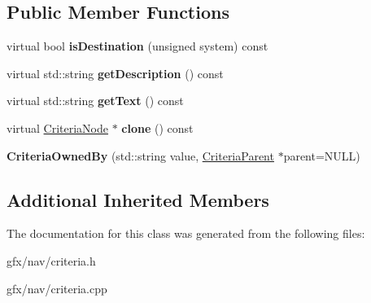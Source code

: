\subsection*{Public Member Functions}
\begin{DoxyCompactItemize}
\item 
virtual bool {\bfseries is\+Destination} (unsigned system) const \hypertarget{classCriteriaOwnedBy_adba0159fcddd0f1c9c232ff5457daf87}{}\label{classCriteriaOwnedBy_adba0159fcddd0f1c9c232ff5457daf87}

\item 
virtual std\+::string {\bfseries get\+Description} () const \hypertarget{classCriteriaOwnedBy_a8850acad3bc7efe24fba1770d540ae29}{}\label{classCriteriaOwnedBy_a8850acad3bc7efe24fba1770d540ae29}

\item 
virtual std\+::string {\bfseries get\+Text} () const \hypertarget{classCriteriaOwnedBy_a6b0bce2ffceb68965bc5eb674f5de909}{}\label{classCriteriaOwnedBy_a6b0bce2ffceb68965bc5eb674f5de909}

\item 
virtual \hyperlink{classCriteriaNode}{Criteria\+Node} $\ast$ {\bfseries clone} () const \hypertarget{classCriteriaOwnedBy_ae08538ab098360216dfa2403635efbe2}{}\label{classCriteriaOwnedBy_ae08538ab098360216dfa2403635efbe2}

\item 
{\bfseries Criteria\+Owned\+By} (std\+::string value, \hyperlink{classCriteriaParent}{Criteria\+Parent} $\ast$parent=N\+U\+LL)\hypertarget{classCriteriaOwnedBy_a110450a8f29a065c0a83ebd82fdc30df}{}\label{classCriteriaOwnedBy_a110450a8f29a065c0a83ebd82fdc30df}

\end{DoxyCompactItemize}
\subsection*{Additional Inherited Members}


The documentation for this class was generated from the following files\+:\begin{DoxyCompactItemize}
\item 
gfx/nav/criteria.\+h\item 
gfx/nav/criteria.\+cpp\end{DoxyCompactItemize}
